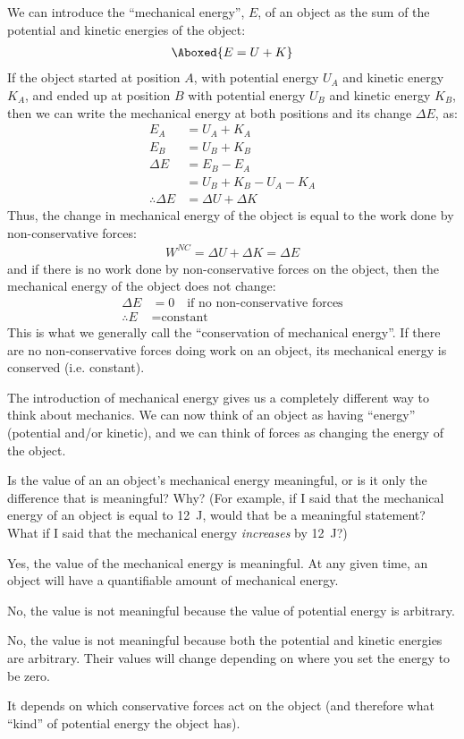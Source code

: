 We can introduce the ``mechanical energy'', $E$, of an object as the sum of the potential and kinetic energies of the object:
\begin{align}
\Aboxed{E = U+K}
\end{align}
If the object started at position $A$, with potential energy $U_A$ and kinetic energy $K_A$, and ended up at position $B$ with potential energy $U_B$ and kinetic energy $K_B$, then we can write the mechanical energy at both positions and its change $\Delta E$, as:
\begin{align*}
E_A &= U_A + K_A\\
E_B &= U_B + K_B\\
\Delta E &= E_B - E_A \\
&= U_B + K_B - U_A - K_A\\
\therefore \Delta E &= \Delta U + \Delta K
\end{align*}
Thus, the change in mechanical energy of the object is equal to the work done by non-conservative forces:
\begin{align*}
W^{NC} = \Delta U + \Delta K = \Delta E
\end{align*}
and if there is no work done by non-conservative forces on the object, then the mechanical energy of the object does not change:
\begin{align*}
\Delta E &= 0\quad\text{if no non-conservative forces}\\
\therefore E &= \text{constant}
\end{align*}
This is what we generally call the ``conservation of mechanical energy''. If there are no non-conservative forces doing work on an object, its mechanical energy is conserved (i.e. constant). 

The introduction of mechanical energy gives us a completely different way to think about mechanics. We can now think of an object as having ``energy'' (potential and/or kinetic), and we can think of forces as changing the energy of the object.

\begin{checkpoint}
\begin{MCquestion}{Is the value of an an object's mechanical energy meaningful, or is it only the difference that is meaningful? Why? (For example, if I said that the mechanical energy of an object is equal to \SI{12}{J}, would that be a meaningful statement? What if I said that the mechanical energy \textit{increases} by \SI{12}{J}?)}
\item Yes, the value of the mechanical energy is meaningful. At any given time, an object will have a quantifiable amount of mechanical energy.
\item No, the value is not meaningful because the value of potential energy is arbitrary. \correct
\item No, the value is not meaningful because both the potential and kinetic energies are arbitrary. Their values will change depending on where you set the energy to be zero.
\item It depends on which conservative forces act on the object (and therefore what ``kind'' of potential energy the object has).
\end{MCquestion}
\end{checkpoint}

